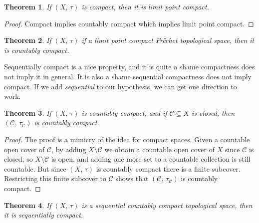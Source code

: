 \documentclass{article}
\theoremstyle{plain}
\newtheorem{theorem}{Theorem}[section]
\theoremstyle{normal}
\begin{document}
        \begin{theorem}
            If $(X,\,\tau)$ is compact, then it is limit point compact.
        \end{theorem}
        \begin{proof}
            Compact implies countably compact which implies limit point compact.
        \end{proof}
        \begin{theorem}
            If $(X,\,\tau)$ if a limit point compact Fr\"{e}chet topological
            space, then it is countably compact.
        \end{theorem}
        Sequentially compact is a nice property, and it is quite a shame
        compactness does not imply it in general. It is also a shame
        sequential compactness does not imply compact. If we add
        \textit{sequential} to our hypothesis, we can get one direction to
        work.
        \begin{theorem}
            If $(X,\,\tau)$ is countably compact, and if
            $\mathcal{C}\subseteq{X}$ is closed, then
            $(\mathcal{C},\,\tau_{\mathcal{C}})$ is countably compact.
        \end{theorem}
        \begin{proof}
            The proof is a mimicry of the idea for compact spaces. Given
            a countable open cover of $\mathcal{C}$, by adding
            $X\setminus\mathcal{C}$ we obtain a countable open cover of $X$
            since $\mathcal{C}$ is closed, so $X\setminus\mathcal{C}$ is open,
            and adding one more set to a countable collection is still
            countable. But since $(X,\,\tau)$ is countably compact there is a
            finite subcover. Restricting this finite subcover to $\mathcal{C}$
            shows that $(\mathcal{C},\,\tau_{\mathcal{C}})$ is countably
            compact. 
        \end{proof}
        \begin{theorem}
            If $(X,\,\tau)$ is a sequential countably compact topological space,
            then it is sequentially compact.
        \end{theorem}
\end{document}
